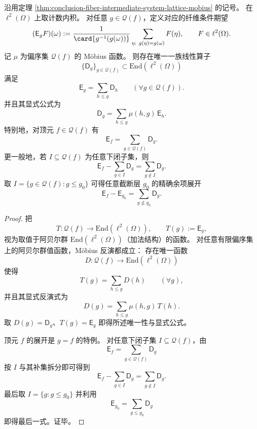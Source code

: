 \begin{theorem}\label{thm:conclusion-fiber-intermediate-system-operator-mobius-correction}
沿用定理 \ref{thm:conclusion-fiber-intermediate-system-lattice-mobius} 的记号。
在 \(\ell^2(\Omega)\) 上取计数内积。
对任意 \(g\in\mathcal Q(f)\)，定义对应的纤维条件期望
\[
(\mathsf E_gF)(\omega)
:=
\frac{1}{\card{g^{-1}(g(\omega))}}
\sum_{\eta:\ g(\eta)=g(\omega)}F(\eta),
\qquad
F\in\ell^2(\Omega).
\]
记 \(\mu\) 为偏序集 \(\mathcal Q(f)\) 的 Möbius 函数。
则存在唯一一族线性算子
\[
\{\mathsf D_g\}_{g\in\mathcal Q(f)}\subset \mathrm{End}(\ell^2(\Omega))
\]
满足
\[
\mathsf E_g=\sum_{h\le g}\mathsf D_h
\qquad
(\forall g\in\mathcal Q(f)).
\]
并且其显式公式为
\[
\mathsf D_g=\sum_{h\le g}\mu(h,g)\,\mathsf E_h.
\]
特别地，对顶元 \(f\in\mathcal Q(f)\) 有
\[
\mathsf E_f=\sum_{g\in\mathcal Q(f)}\mathsf D_g.
\]
更一般地，若 \(I\subseteq\mathcal Q(f)\) 为任意下闭子集，则
\[
\mathsf E_f-\sum_{g\in I}\mathsf D_g
=
\sum_{g\notin I}\mathsf D_g.
\]
取 \(I=\{g\in\mathcal Q(f):g\le g_0\}\) 可得任意截断层 \(g_0\) 的精确余项展开
\[
\mathsf E_f-\mathsf E_{g_0}
=
\sum_{g\not\le g_0}\mathsf D_g.
\]
\end{theorem}
\begin{proof}
把
\[
T:\mathcal Q(f)\to \mathrm{End}(\ell^2(\Omega)),
\qquad
T(g):=\mathsf E_g,
\]
视为取值于阿贝尔群 \(\mathrm{End}(\ell^2(\Omega))\)（加法结构）的函数。
对任意有限偏序集上的阿贝尔群值函数，Möbius 反演都成立：
存在唯一函数
\[
D:\mathcal Q(f)\to \mathrm{End}(\ell^2(\Omega))
\]
使得
\[
T(g)=\sum_{h\le g}D(h)
\qquad(\forall g),
\]
并且其显式反演式为
\[
D(g)=\sum_{h\le g}\mu(h,g)\,T(h).
\]
取 \(D(g)=\mathsf D_g\)、\(T(g)=\mathsf E_g\) 即得所述唯一性与显式公式。

顶元 \(f\) 的展开是 \(g=f\) 的特例。
对任意下闭子集 \(I\subseteq\mathcal Q(f)\)，由
\[
\mathsf E_f=\sum_{g\in\mathcal Q(f)}\mathsf D_g
\]
按 \(I\) 与其补集拆分即可得到
\[
\mathsf E_f-\sum_{g\in I}\mathsf D_g
=
\sum_{g\notin I}\mathsf D_g.
\]
最后取 \(I=\{g:g\le g_0\}\) 并利用
\[
\mathsf E_{g_0}=\sum_{g\le g_0}\mathsf D_g
\]
即得最后一式。证毕。
\end{proof}

